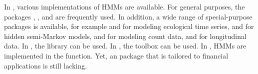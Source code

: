 \documentclass[article,shortnames]{jss}
\newcommand{\fct}[1]{\code{#1()}}
\begin{document}
In  \citep{r21}, various implementations of HMMs are available. For general purposes, the packages  \citep{him10},  \citep{vis10}, and  \citep{jac11} are frequently used. In addition, a wide range of special-purpose packages is available, for example  \citep{mic16} and  \citep{mcc18} for modeling ecological time series,  \citep{bul10} and  \citep{oco11} for hidden semi-Markov models,  \citep{tur14} and  \citep{ada19b} for modeling count data, and  \citep{bar17} for longitudinal data. In , the library  \citep{leb22} can be used. In  \citep{matlab}, the  toolbox \citep{che22} can be used. In  \citep{stata}, HMMs are implemented in the \fct{mswitch} function. Yet, an  package that is tailored to financial applications is still lacking.
\end{document}
